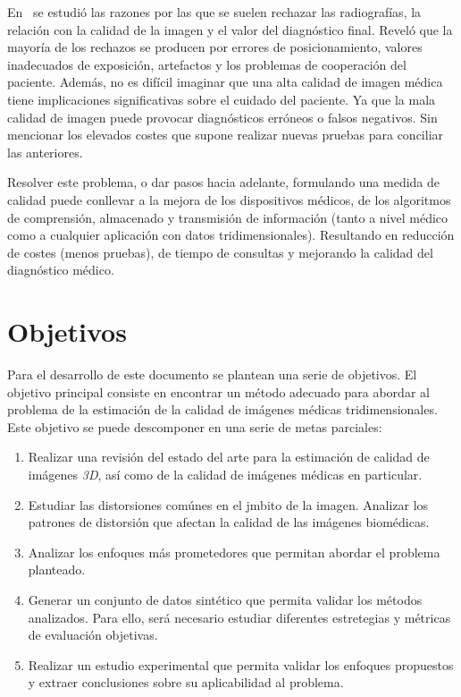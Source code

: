 En~\cite{XrayRejectionFactor} se estudió las razones por las que se suelen 
rechazar las radiografías, la relación con la calidad de la imagen y el valor
del diagnóstico final. Reveló que la mayoría de los rechazos se producen por 
errores de posicionamiento, valores inadecuados de exposición, artefactos 
y los problemas de cooperación del paciente. 
Además, no es difícil imaginar que una alta 
calidad de imagen médica tiene implicaciones significativas sobre el cuidado
del paciente. Ya que la mala calidad de imagen puede provocar diagnósticos erróneos 
o falsos negativos. Sin mencionar los elevados costes que supone realizar 
nuevas pruebas para conciliar las anteriores.
 
Resolver este problema, o dar pasos hacia adelante, formulando una medida de calidad
puede conllevar a la mejora de los dispositivos médicos, de los algoritmos de comprensión, almacenado 
y transmisión de información (tanto a nivel médico como a cualquier 
aplicación con datos tridimensionales).
Resultando en reducción de costes (menos pruebas), de tiempo de consultas y 
mejorando la calidad del diagnóstico médico. 

\section{Objetivos}
Para el desarrollo de este documento se plantean una serie de objetivos. 
El objetivo principal consiste en encontrar un método adecuado para abordar al 
problema de la estimación de la calidad de imágenes médicas tridimensionales. 
Este objetivo se puede descomponer en una serie de metas parciales: 
\begin{enumerate}
  \item Realizar una revisión del estado del arte para la estimación de calidad 
    de imágenes \emph{3D}, así como de la calidad de imágenes médicas en particular.
  \item Estudiar las distorsiones comúnes en el jmbito de la imagen. 
    Analizar los patrones de distorsión que afectan la calidad de las imágenes 
    biomédicas.
  \item Analizar los enfoques más prometedores que permitan abordar el problema planteado. 
  \item Generar un conjunto de datos sintético que permita validar 
    los métodos analizados. Para ello, será necesario estudiar diferentes 
    estretegias y métricas de evaluación objetivas\cite{ITU-R.2012, ITU-r.2021, DatasetGeneration}.
  \item Realizar un estudio experimental que permita validar los enfoques 
    propuestos y extraer conclusiones sobre su aplicabilidad al problema. 
\end{enumerate}
